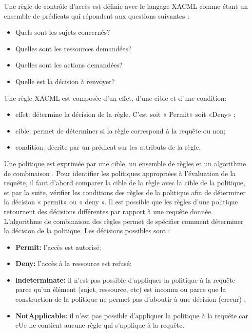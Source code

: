 \label{sectionRègle}

Une règle de contrôle d'accès est définie avec le langage XACML comme étant un ensemble de prédicats qui répondent aux questions suivantes \cite{errachid11}:
\begin{itemize}
  \item Quels sont les sujets concernés?
  \item Quelles sont les ressources demandées?
  \item Quelles sont les actions demandées?
  \item Quelle est la décision à renvoyer?
  \end{itemize}
  
 \hspace*{0.5cm} Une règle XACML est composée d'un effet, d'une cible et d'une condition:
 \begin{itemize}
 \item effet: détermine la décision de la règle. C'est soit « Permit» soit «Deny» ;
 \item cible: permet de déterminer si la règle correspond à la requête ou non;
 \item condition: décrite par un prédicat sur les attributs de la règle.
\end{itemize}  
 

\label{sectionPolitique}

Une politique est exprimée par une cible, un ensemble de règles et un algorithme de
combinaison \cite{errachid11}. Pour identifier les politiques appropriées à l'évaluation de la requête, il faut d'abord comparer la cible de la règle avec la cible de la politique, et par la suite, vérifier les conditions des règles de la politique afin de déterminer la décision « permit» ou « deny ». Il est possible que les règles d'une politique retournent des décisions différentes par rapport à une requête donnée. L'algorithme de combinaison des règles permet de spécifier comment déterminer la décision de la politique.
Les décisions possibles sont \cite{standard13}:
\begin{itemize}
\item \textbf{Permit:} l'accès est autorisé;
\item \textbf{Deny:} l'accès à la ressource est refusé;
\item \textbf{lndeterminate:} il n'est pas possible d'appliquer la politique à la requête parce qu'un
élément (sujet, ressource, etc) est inconnu ou parce que la construction de la politique
ne permet pas d'aboutir à une décision (erreur) ;
\item \textbf{NotApplicable:} il n'est pas possible d'appliquer la politique à la requête car eUe ne
contient aucune règle qui s'applique à la requête.
\end{itemize}

